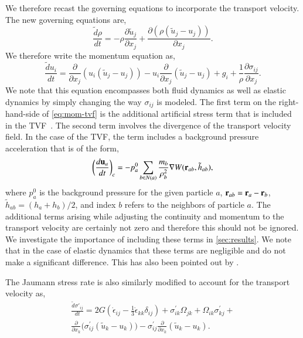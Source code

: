 We therefore recast the governing equations to incorporate the transport
velocity. The new governing equations are,
\begin{equation}
  \label{eq:ce-tvf}
  \frac{\tilde{d} \rho}{d t} =
  - \rho \frac{\partial \tilde{u}_j}{\partial x_j} +
  \frac{\partial (\rho (\tilde{u}_j - u_j))}{\partial x_j}.
\end{equation}
We therefore write the momentum equation as,
\begin{equation}
  \label{eq:mom-tvf}
  \frac{\tilde{d} u_i}{d t} =
  \frac{\partial}{\partial x_j} (u_i (\tilde{u}_j - u_j))
  - u_i \frac{\partial}{\partial x_j} (\tilde{u}_j - u_j)
  + g_i
  +\frac{1}{\rho} \frac{\partial \sigma_{ij}}{\partial x_j}.
\end{equation}
We note that this equation encompasses both fluid dynamics as well as elastic
dynamics by simply changing the way $\sigma_{ij}$ is modeled. The first term
on the right-hand-side of \cref{eq:mom-tvf} is the additional artificial
stress term that is included in the TVF~\citep{Adami2013}. The second term
involves the divergence of the transport velocity field. In the case of the
TVF, the term includes a background pressure acceleration that is of the form,
\begin{equation}
  \label{eq:tvf-accel}
  \bigg(\frac{d \mathbf{u}_a}{dt}\bigg)_{c} = - p^0_a \sum_{b \in N(a)}
  \frac{m_b}{\rho_b^2} \nabla W(\mathbf{r}_{ab}, \tilde{h}_{ab}),
\end{equation}
where $p^0_a$ is the background pressure for the given particle $a$,
$\mathbf{r}_{ab} = \mathbf{r}_a - \mathbf{r}_b$, $\tilde{h}_{ab} = (h_a + h_b)/2$, and
index $b$ refers to the neighbors of particle $a$. The additional terms arising
while adjusting the continuity and momentum to the transport velocity are
certainly not zero and therefore this should not be ignored. We investigate the
importance of including these terms in \cref{sec:results}. We note that in the
case of elastic dynamics that these terms are negligible and do not make a
significant difference. This has also been pointed out by
\textcite{zhang_hu_adams17}.

The Jaumann stress rate is also similarly modified to account for the
transport velocity as,
\begin{multline}
  \label{eq:modified-jaumann-stress-rate}
  \frac{\tilde{d} \sigma'_{ij}}{dt} = 2G (\dot{\epsilon}_{ij} - \frac{1}{3}
  \dot{\epsilon}_{kk} \delta_{ij}) + \sigma^{'}_{ik}  \Omega_{jk} +
  \Omega_{ik} \sigma^{'}_{kj} + \\
  \frac{\partial}{\partial x_k}\big(\sigma^{'}_{ij}  (\tilde{u}_k - u_k)\big)
  - \sigma^{'}_{ij} \frac{\partial}{\partial x_k} (\tilde{u}_k - u_k).
\end{multline}


